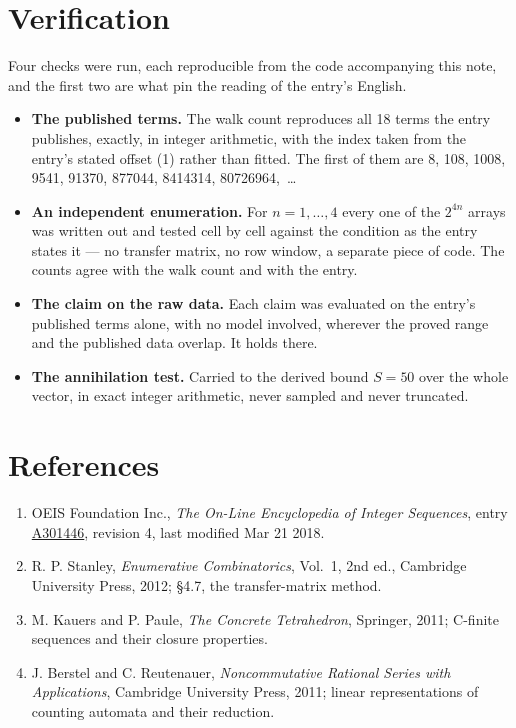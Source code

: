 \documentclass[11pt]{article}
\theoremstyle{definition}
\begin{document}
\section{Verification}

Four checks were run, each reproducible from the code accompanying this note, and the first two are what pin the reading of the entry's English.

\begin{itemize}

\item {\bfseries The published terms.} The walk count reproduces all 18 terms the entry publishes, exactly, in integer arithmetic, with the index taken from the entry's stated offset (1) rather than fitted. The first of them are 8, 108, 1008, 9541, 91370, 877044, 8414314, 80726964,~\dots

\item {\bfseries An independent enumeration.} For $n = 1,\dots,4$ every one of the $2^{4n}$ arrays was written out and tested cell by cell against the condition as the entry states it --- no transfer matrix, no row window, a separate piece of code. The counts agree with the walk count and with the entry.

\item {\bfseries The claim on the raw data.} Each claim was evaluated on the entry's published terms alone, with no model involved, wherever the proved range and the published data overlap. It holds there.

\item {\bfseries The annihilation test.} Carried to the derived bound $S = 50$ over the whole vector, in exact integer arithmetic, never sampled and never truncated.

\end{itemize}

\section{References}

\begin{enumerate}

\item OEIS Foundation Inc., \emph{The On-Line Encyclopedia of Integer Sequences}, entry \href{https://oeis.org/A301446}{A301446}, revision 4, last modified Mar 21 2018.

\item R. P. Stanley, \emph{Enumerative Combinatorics}, Vol.~1, 2nd ed., Cambridge University Press, 2012; \S4.7, the transfer-matrix method.

\item M. Kauers and P. Paule, \emph{The Concrete Tetrahedron}, Springer, 2011; C-finite sequences and their closure properties.

\item J. Berstel and C. Reutenauer, \emph{Noncommutative Rational Series with Applications}, Cambridge University Press, 2011; linear representations of counting automata and their reduction.

\end{enumerate}
\end{document}
